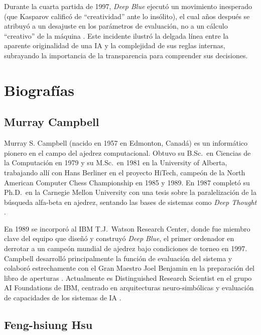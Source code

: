 \documentclass[a4paper, 12pt]{article}
\begin{document}
Durante la cuarta partida de 1997, \textit{Deep Blue} ejecutó un 
movimiento inesperado (que Kasparov calificó de “creatividad” 
ante lo insólito), el cual años después se atribuyó a un desajuste 
en los parámetros de evaluación, no a un cálculo “creativo” de la 
máquina \cite{latson2015}. Este incidente ilustró la delgada línea 
entre la aparente originalidad de una IA y la complejidad de sus 
reglas internas, subrayando la importancia de la transparencia para 
comprender sus decisiones.

\section{Biografías}

\subsection*{Murray Campbell}

Murray S. Campbell (nacido en 1957 en Edmonton, Canadá) es un 
informático pionero en el campo del ajedrez computacional. 
Obtuvo su B.Sc.\ en Ciencias de la Computación en 1979 y su M.Sc.\ 
en 1981 en la University of Alberta, trabajando allí con Hans 
Berliner en el proyecto HiTech, campeón de la North American 
Computer Chess Championship en 1985 y 1989. 
En 1987 completó su Ph.D.\ en la Carnegie Mellon University con 
una tesis sobre la paralelización de la búsqueda alfa-beta en 
ajedrez, sentando las bases de sistemas como \emph{Deep Thought} 
\cite{icore2004bod}.

En 1989 se incorporó al IBM T.J.\ Watson Research Center, donde 
fue miembro clave del equipo que diseñó y construyó \emph{Deep Blue}, el 
primer ordenador en derrotar a un campeón mundial de ajedrez bajo 
condiciones de torneo en 1997. Campbell 
desarrolló principalmente la función de evaluación del sistema y 
colaboró estrechamente con el Gran Maestro Joel Benjamin en la 
preparación del libro de aperturas \cite{chessprog_murray}. 
Actualmente es Distinguished Research Scientist en el grupo AI 
Foundations de IBM, centrado en arquitecturas neuro-simbólicas y 
evaluación de capacidades de los sistemas de IA \cite{ibmCampbellBio}.


\subsection*{Feng-hsiung Hsu}
\end{document}
